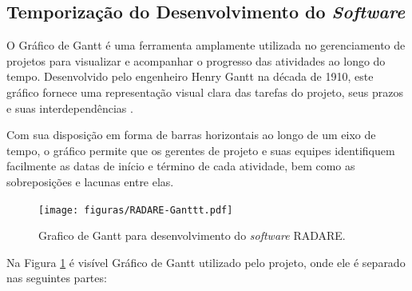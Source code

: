 \subsection{Temporização do Desenvolvimento do \textit{Software}}

O Gráfico de Gantt é uma ferramenta amplamente utilizada no gerenciamento de projetos para visualizar e acompanhar o progresso das atividades ao longo do tempo. Desenvolvido pelo engenheiro Henry Gantt na década de 1910, este gráfico fornece uma representação visual clara das tarefas do projeto, seus prazos e suas interdependências \cite{ganttchart}. 

Com sua disposição em forma de barras horizontais ao longo de um eixo de tempo, o gráfico permite que os gerentes de projeto e suas equipes identifiquem facilmente as datas de início e término de cada atividade, bem como as sobreposições e lacunas entre elas.
    
\begin{figure}[h]
    \centering
    \texttt{[image: figuras/RADARE-Ganttt.pdf]} %
    \caption{Grafico de Gantt para desenvolvimento do \textit{software} RADARE.}
    \label{fig:ganttChart}
\end{figure}    

Na Figura \ref{fig:ganttChart} é visível Gráfico de Gantt utilizado pelo projeto, onde ele é separado nas seguintes partes: 
    
